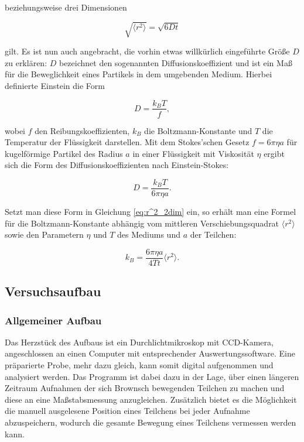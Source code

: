 \documentclass{article}
\begin{document}
beziehungsweise drei Dimensionen

\begin{equation}
    \sqrt{\langle r^2 \rangle} = \sqrt{6Dt}
\end{equation}

gilt. Es ist nun auch angebracht, die vorhin etwas willkürlich eingeführte Größe $D$ zu erklären: $D$ bezeichnet den sogenannten Diffusionskoeffizient und ist ein Maß für die Beweglichkeit eines Partikels in dem umgebenden Medium. Hierbei definierte Einstein die Form

\begin{equation}
    D = \frac{k_B T}{f},
\end{equation}

wobei $f$ den Reibungskoeffizienten, $k_B$ die Boltzmann-Konstante und $T$ die Temperatur der Flüssigkeit darstellen. Mit dem Stokes'schen Gesetz $f = 6 \pi \eta a$ für kugelförmige Partikel des Radius $a$ in einer Flüssigkeit mit Viskosität $\eta$ ergibt sich die Form des Diffusionskoeffizienten nach Einstein-Stokes:

\begin{equation}
    D = \frac{k_B T}{6 \pi \eta a}.
    \label{eq:Einst_Stokes_D}
\end{equation}

Setzt man diese Form in Gleichung \ref{eq:r^2_2dim} ein, so erhält man eine Formel für die Boltzmann-Konstante abhängig vom mittleren Verschiebungsquadrat $\langle r^2 \rangle$ sowie den Parametern $\eta$ und $T$ des Mediums und $a$ der Teilchen:

\begin{equation}
    k_B = \frac{6 \pi \eta a}{4 T t} \langle r^2 \rangle.
    \label{eq:Boltzmann}
\end{equation}

\newpage
\subsection{Versuchsaufbau}

\subsubsection{Allgemeiner Aufbau}

Das Herzstück des Aufbaus ist ein Durchlichtmikroskop mit CCD-Kamera, angeschlossen an einen Computer mit entsprechender Auswertungssoftware. Eine präparierte Probe, mehr dazu gleich, kann somit digital aufgenommen und analysiert werden. Das Programm ist dabei dazu in der Lage, über einen längeren Zeitraum Aufnahmen der sich Brownsch bewegenden Teilchen zu machen und diese an eine Maßstabsmessung anzugleichen. Zusätzlich bietet es die Möglichkeit die manuell ausgelesene Position eines Teilchens bei jeder Aufnahme abzuspeichern, wodurch die gesamte Bewegung eines Teilchens vermessen werden kann. 
\end{document}
